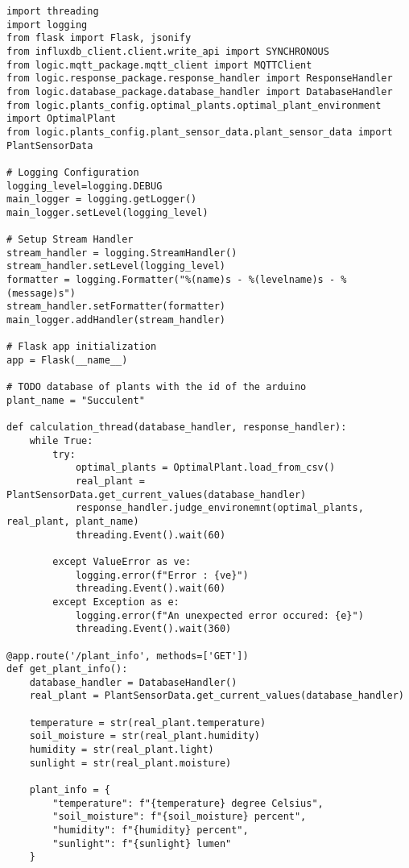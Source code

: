 \begin{longlisting}
\begin{verbatim}
import threading
import logging
from flask import Flask, jsonify
from influxdb_client.client.write_api import SYNCHRONOUS
from logic.mqtt_package.mqtt_client import MQTTClient
from logic.response_package.response_handler import ResponseHandler
from logic.database_package.database_handler import DatabaseHandler
from logic.plants_config.optimal_plants.optimal_plant_environment import OptimalPlant
from logic.plants_config.plant_sensor_data.plant_sensor_data import PlantSensorData

# Logging Configuration
logging_level=logging.DEBUG
main_logger = logging.getLogger()
main_logger.setLevel(logging_level)

# Setup Stream Handler
stream_handler = logging.StreamHandler()
stream_handler.setLevel(logging_level)
formatter = logging.Formatter("%(name)s - %(levelname)s - %(message)s")
stream_handler.setFormatter(formatter)
main_logger.addHandler(stream_handler)

# Flask app initialization
app = Flask(__name__)

# TODO database of plants with the id of the arduino
plant_name = "Succulent"

def calculation_thread(database_handler, response_handler):
    while True:
        try:
            optimal_plants = OptimalPlant.load_from_csv()
            real_plant = PlantSensorData.get_current_values(database_handler)
            response_handler.judge_environemnt(optimal_plants, real_plant, plant_name)
            threading.Event().wait(60)

        except ValueError as ve:
            logging.error(f"Error : {ve}")
            threading.Event().wait(60)
        except Exception as e:
            logging.error(f"An unexpected error occured: {e}")
            threading.Event().wait(360)

@app.route('/plant_info', methods=['GET'])
def get_plant_info():
    database_handler = DatabaseHandler()
    real_plant = PlantSensorData.get_current_values(database_handler)
    
    temperature = str(real_plant.temperature)
    soil_moisture = str(real_plant.humidity)
    humidity = str(real_plant.light)
    sunlight = str(real_plant.moisture)
    
    plant_info = {
        "temperature": f"{temperature} degree Celsius",
        "soil_moisture": f"{soil_moisture} percent",
        "humidity": f"{humidity} percent",
        "sunlight": f"{sunlight} lumen"
    }
    

\end{verbatim}
\end{longlisting}
